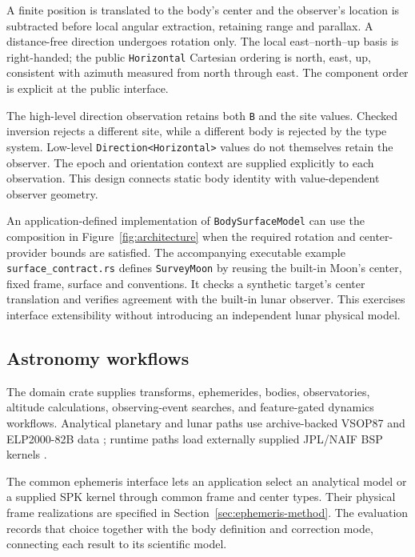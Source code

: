 A finite position is translated to the body's center and the observer's location is subtracted
before local angular extraction, retaining range and parallax. A distance-free direction undergoes
rotation only. The local east--north--up basis is right-handed; the public \texttt{Horizontal}
Cartesian ordering is north, east, up, consistent with azimuth measured from north through east.
The component order is explicit at the public interface.

The high-level direction observation retains both \texttt{B} and the site values. Checked inversion
rejects a different site, while a different body is rejected by the type system. Low-level
\texttt{Direction<Horizontal>} values do not themselves retain the observer. The epoch and
orientation context are supplied explicitly to each observation. This design connects static body
identity with value-dependent observer geometry.

An application-defined implementation of \texttt{BodySurfaceModel} can use the composition in
Figure~\ref{fig:architecture} when the required rotation and center-provider bounds are satisfied.
The accompanying executable example \texttt{surface\_contract.rs} defines \texttt{SurveyMoon} by
reusing the built-in Moon's center, fixed frame, surface and conventions. It checks a synthetic
target's center translation and verifies agreement with the built-in lunar observer. This exercises
interface extensibility without introducing an independent lunar physical model.

\subsection{Astronomy workflows}

The domain crate supplies transforms, ephemerides, bodies, observatories, altitude calculations,
observing-event searches, and feature-gated dynamics workflows. Analytical planetary and lunar
paths use archive-backed VSOP87 and ELP2000-82B data
\cite{bretagnon1988vsop87,chapront1983elp2000}; runtime paths load externally supplied JPL/NAIF BSP
kernels \cite{naifspk,park2021de440}.



The common ephemeris interface lets an application select an analytical model or a supplied SPK
kernel through common frame and center types. Their physical frame realizations are specified in
Section~\ref{sec:ephemeris-method}. The evaluation records that choice together with the body
definition and correction mode, connecting each result to its scientific model.

